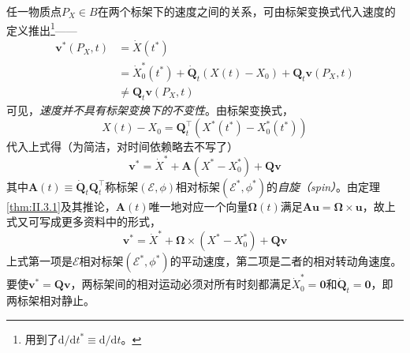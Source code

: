 \documentclass[main.tex]{subfiles}
\begin{document}
任一物质点$P_X\in B$在两个标架下的速度之间的关系，可由标架变换式代入速度的定义推出\footnote{用到了$\mathrm{d}/\mathrm{d}t^*\equiv\mathrm{d}/\mathrm{d}t$。}——
\begin{align*}
    \mathbf{v}^*\left(P_X,t\right) & =\dot{X}\left(t^*\right)                                                                                                 \\
                                   & =\dot{X}_0^*\left(t^*\right)+\dot{\mathbf{Q}}_t\left(X\left(t\right)-X_0\right)+\mathbf{Q}_t\mathbf{v}\left(P_X,t\right) \\
                                   & \neq\mathbf{Q}_t\mathbf{v}\left(P_X,t\right)
\end{align*}
可见，\emph{速度并不具有标架变换下的不变性}。由标架变换式，
\[X\left(t\right)-X_0=\mathbf{Q}_t^\intercal\left(X^*\left(t^*\right)-X_0^*\left(t^*\right)\right)\]
代入上式得（为简洁，对时间依赖略去不写了）
\[\mathbf{v}^*=\dot{X}^*+\mathbf{A}\left(X^*-X_0^*\right)+\mathbf{Qv}\]
其中$\mathbf{A}\left(t\right)\equiv\dot{\mathbf{Q}}_t\mathbf{Q}_t^\intercal$称标架$\left(\mathcal{E},\phi\right)$相对标架$\left(\mathcal{E}^*,\phi^*\right)$的\emph{自旋（spin）}。由定理\ref{thm:II.3.1}及其推论，$\mathbf{A}\left(t\right)$唯一地对应一个向量$\symbf{\Omega}\left(t\right)$满足$\mathbf{Au}=\symbf{\Omega}\times\mathbf{u}$，故上式又可写成更多资料中的形式，
\[\mathbf{v}^*=\dot{X}^*+\symbf{\Omega}\times\left(X^*-X_0^*\right)+\mathbf{Qv}\]
上式第一项是$\mathcal{E}$相对标架$\left(\mathcal{E}^*,\phi^*\right)$的平动速度，第二项是二者的相对转动角速度。要使$\mathbf{v}^*=\mathbf{Qv}$，两标架间的相对运动必须对所有时刻都满足$\dot{X}_0^*=\mathbf{0}$和$\dot{\mathbf{Q}}_t=\mathbf{0}$，即两标架相对静止。
\end{document}
